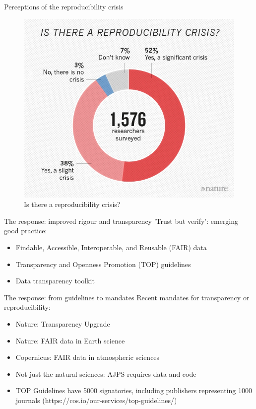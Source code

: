 \documentclass[aspectratio=169, 12pt]{beamer} %
\begin{document}
\begin{frame}{Perceptions of the reproducibility crisis}
  \begin{figure}[H]
    \centering
        \includegraphics[height=.7\textheight]{figures/reproducibility-graphic-online1.jpeg}
        \caption{Is there a reproducibility crisis? \cite{Baker2016-cf}}
        \label{fig:figure1}
  \end{figure}
\end{frame}

\begin{frame}{The response: improved rigour and transparency}
  'Trust but verify': emerging good practice:
    \begin{itemize}
        \item Findable, Accessible, Interoperable, and Reusable (FAIR) data \cite{Wilkinson2016-mr, Go-fair2017-vs}
        \item Transparency and Openness Promotion (TOP) guidelines \cite{Nosek2015-wm}
        \item Data transparency toolkit \cite{Perkel2018-rw}
    \end{itemize}
\end{frame}

\begin{frame}{The response: from guidelines to mandates}
  Recent mandates for transparency or reproducibility:
    \begin{itemize}
        \item Nature: Transparency Upgrade \cite{Nature2017-lq}
        \item Nature: FAIR data in Earth science \cite{Nature2019-ng}
        \item Copernicus: FAIR data in atmospheric sciences \cite{Van_Edig2018-bu}
        \item Not just the natural sciences: AJPS requires data and code \cite{Jacoby2017-lw, Ajps2015-ex} 
        \item TOP Guidelines have 5000 signatories, including publishers representing 1000 journals (https://cos.io/our-services/top-guidelines/)
    \end{itemize}
\end{frame}
\end{document}
